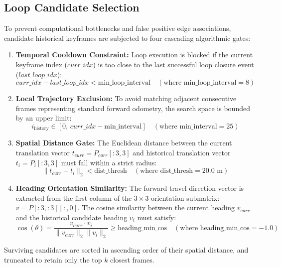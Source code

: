 \documentclass{article}
\begin{document}
\subsection{Loop Candidate Selection}
To prevent computational bottlenecks and false positive edge associations, candidate historical keyframes are subjected to four cascading algorithmic gates:
\begin{enumerate}
    \item \textbf{Temporal Cooldown Constraint:} Loop execution is blocked if the current keyframe index ($curr\_idx$) is too close to the last successful loop closure event ($last\_loop\_idx$):
    \begin{equation}
        curr\_idx - last\_loop\_idx < \text{min\_loop\_interval} \quad (\text{where } \text{min\_loop\_interval} = 8)
    \end{equation}
    \item \textbf{Local Trajectory Exclusion:} To avoid matching adjacent consecutive frames representing standard forward odometry, the search space is bounded by an upper limit:
    \begin{equation}
        i_{\text{history}} \in [0, \, curr\_idx - \text{min\_interval}] \quad (\text{where } \text{min\_interval} = 25)
    \end{equation}
    \item \textbf{Spatial Distance Gate:} The Euclidean distance between the current translation vector $t_{curr} = P_{curr}[:3, 3]$ and historical translation vector $t_{i} = P_{i}[:3, 3]$ must fall within a strict radius:
    \begin{equation}
        \|t_{curr} - t_{i}\|_2 < \text{dist\_thresh} \quad (\text{where } \text{dist\_thresh} = 20.0\text{ m})
    \end{equation}
    \item \textbf{Heading Orientation Similarity:} The forward travel direction vector is extracted from the first column of the $3 \times 3$ orientation submatrix: $v = P[:3, :3][:, 0]$. The cosine similarity between the current heading $v_{curr}$ and the historical candidate heading $v_{i}$ must satisfy:
    \begin{equation}
        \cos(\theta) = \frac{v_{curr} \cdot v_{i}}{\|v_{curr}\|_2 \|v_{i}\|_2} \ge \text{heading\_min\_cos} \quad (\text{where } \text{heading\_min\_cos} = -1.0)
    \end{equation}
\end{enumerate}
Surviving candidates are sorted in ascending order of their spatial distance, and truncated to retain only the top $k$ closest frames.
\end{document}
